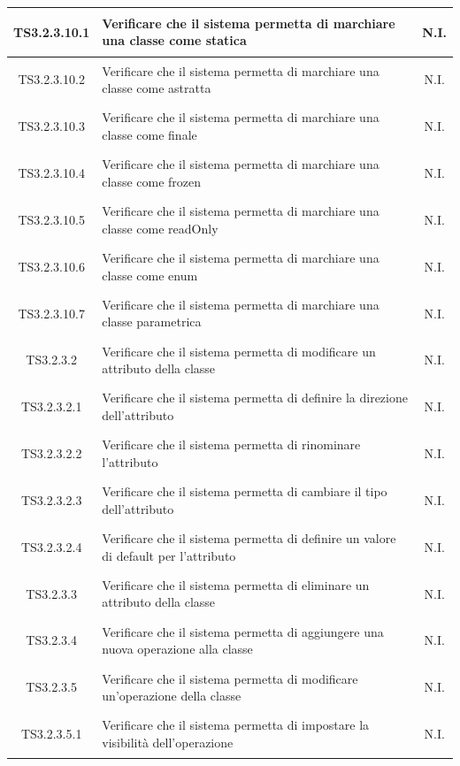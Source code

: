 \documentclass[../PianoDiQualifica.tex]{subfiles}
\begin{document}
\begin{longtable}{|c|>{\centering}p{10cm}|c|}
	\hypertarget{TS3.2.3.10.1}{TS3.2.3.10.1} & Verificare che il sistema permetta di marchiare una classe come statica & N.I. \\
	\hline
	\hypertarget{TS3.2.3.10.2}{TS3.2.3.10.2} & Verificare che il sistema permetta di marchiare una classe come astratta & N.I. \\
	\hline
	\hypertarget{TS3.2.3.10.3}{TS3.2.3.10.3} & Verificare che il sistema permetta di marchiare una classe come finale & N.I. \\
	\hline
	\hypertarget{TS3.2.3.10.4}{TS3.2.3.10.4} & Verificare che il sistema permetta di marchiare una classe come frozen & N.I. \\
	\hline
	\hypertarget{TS3.2.3.10.5}{TS3.2.3.10.5} & Verificare che il sistema permetta di marchiare una classe come readOnly & N.I. \\
	\hline
	\hypertarget{TS3.2.3.10.6}{TS3.2.3.10.6} & Verificare che il sistema permetta di marchiare una classe come enum & N.I. \\
	\hline
	\hypertarget{TS3.2.3.10.7}{TS3.2.3.10.7} & Verificare che il sistema permetta di marchiare una classe parametrica & N.I. \\
	\hline
	\hypertarget{TS3.2.3.2}{TS3.2.3.2} & Verificare che il sistema permetta di modificare un attributo della classe & N.I. \\
	\hline
	\hypertarget{TS3.2.3.2.1}{TS3.2.3.2.1} & Verificare che il sistema permetta di definire la direzione dell'attributo & N.I. \\
	\hline
	\hypertarget{TS3.2.3.2.2}{TS3.2.3.2.2} & Verificare che il sistema permetta di rinominare l'attributo & N.I. \\
	\hline
	\hypertarget{TS3.2.3.2.3}{TS3.2.3.2.3} & Verificare che il sistema permetta di cambiare il tipo dell'attributo & N.I. \\
	\hline
	\hypertarget{TS3.2.3.2.4}{TS3.2.3.2.4} & Verificare che il sistema permetta di definire un valore di default per l'attributo & N.I. \\
	\hline
	\hypertarget{TS3.2.3.3}{TS3.2.3.3} & Verificare che il sistema permetta di eliminare un attributo della classe & N.I. \\
	\hline
	\hypertarget{TS3.2.3.4}{TS3.2.3.4} & Verificare che il sistema permetta di aggiungere una nuova operazione alla classe & N.I. \\
	\hline
	\hypertarget{TS3.2.3.5}{TS3.2.3.5} & Verificare che il sistema permetta di modificare un'operazione della classe & N.I. \\
	\hline
	\hypertarget{TS3.2.3.5.1}{TS3.2.3.5.1} & Verificare che il sistema permetta di impostare la visibilità dell'operazione & N.I. \\

\end{longtable}
\end{document}

